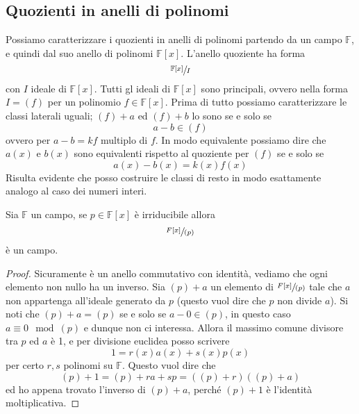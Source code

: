 \subsection{Quozienti in anelli di polinomi}
Possiamo caratterizzare i quozienti in anelli di polinomi partendo da un campo $\mathbb{F}$, e quindi dal suo anello di polinomi $\mathbb{F}[x]$. L'anello quoziente ha forma 
\begin{equation*}
\sfrac{\mathbb{F}[x]}{I}
\end{equation*}
con $I$ ideale di $\mathbb{F}[x]$. Tutti gl ideali di $\mathbb{F}[x]$ sono principali, ovvero nella forma $I=(f)$ per un polinomio $f\in\mathbb{F}[x]$. Prima di tutto possiamo caratterizzare le classi laterali uguali; $(f)+a$ ed $(f)+b$ lo sono se e solo se 
\begin{equation*}
a-b\in(f)
\end{equation*}
ovvero per $a-b=kf$ multiplo di $f$. In modo equivalente possiamo dire che $a(x)$ e $b(x)$ sono equivalenti rispetto al quoziente per $(f)$ se e solo se
\begin{equation*}
a(x)-b(x)=k(x)f(x)
\end{equation*}
Risulta evidente che posso costruire le classi di resto in modo esattamente analogo al caso dei numeri interi.
\begin{proposizione}
	Sia $\mathbb{F}$ un campo, se $p\in\mathbb{F}[x]$ è irriducibile allora 
	\begin{equation*}
	\sfrac{F[x]}{(p)}
	\end{equation*}
	è un campo.
\end{proposizione}
\begin{proof}
	Sicuramente è un anello commutativo con identità, vediamo che ogni elemento non nullo ha un inverso. Sia $(p)+a$ un elemento di $\sfrac{F[x]}{(p)}$ tale che $a$ non appartenga all'ideale generato da $p$ (questo vuol dire che $p$ non divide $a$). Si noti che $(p)+a=(p)$ se e solo se $a-0\in(p)$, in questo caso $a \equiv 0 \mod (p)$ e dunque non ci interessa. Allora il massimo comune divisore tra $p$ ed $a$ è 1, e per divisione euclidea posso scrivere 
	\begin{equation*}
	1=r(x)a(x)+s(x)p(x)
	\end{equation*}
	per certo $r,s$ polinomi su $\mathbb{F}$. Questo vuol dire che 
	\begin{equation*}
	(p)+1=(p)+ra+sp=\left((p)+r\right)\left((p)+a\right)
	\end{equation*}
	ed ho appena trovato l'inverso di $(p)+a$, perché $(p)+1$ è l'identità moltiplicativa.
\end{proof}
